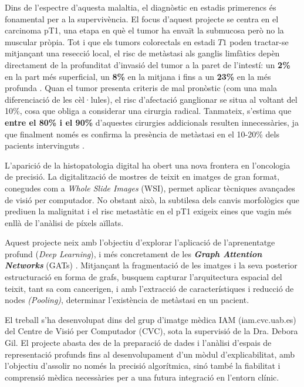 ﻿\documentclass[10pt,a4paper,twocolumn,twoside]{article}
\begin{document}
Dins de l'espectre d'aquesta malaltia, el diagnòstic en estadis primerencs és fonamental per a la supervivència. El focus d'aquest projecte se centra en el carcinoma pT1, una etapa en què el tumor ha envaït la submucosa però no la muscular pròpia. Tot i que els tumors colorectals en estadi $T1$ poden tractar-se mitjançant una resecció local, el risc de metàstasi als ganglis limfàtics depèn directament de la profunditat d'invasió del tumor a la paret de l'intestí: un \textbf{2\%} en la part més superficial, un \textbf{8\%} en la mitjana i fins a un \textbf{23\%} en la més profunda \cite{ParcSalutMar2013}. Quan el tumor presenta criteris de mal pronòstic (com una mala diferenciació de les cèl·lules), el risc d'afectació ganglionar se situa al voltant del 10\%, cosa que obliga a considerar una cirurgia radical. Tanmateix, s'estima que \textbf{entre el 80\% i el 90\%} d'aquestes cirurgies addicionals resulten innecessàries, ja que finalment només es confirma la presència de metàstasi en el 10-20\% dels pacients intervinguts \cite{MartinezDeJuan2024}.

L'aparició de la histopatologia digital ha obert una nova frontera en l'oncologia de precisió. La digitalització de mostres de teixit en imatges de gran format, conegudes com a \textit{Whole Slide Images} (WSI), permet aplicar tècniques avançades de visió per computador. No obstant això, la subtilesa dels canvis morfològics que prediuen la malignitat i el risc metastàtic en el pT1 exigeix eines que vagin més enllà de l'anàlisi de píxels aïllats.

Aquest projecte neix amb l'objectiu d'explorar l'aplicació de l'aprenentatge profund (\textit{Deep Learning}), i més concretament de les \textit{\textbf{Graph Attention Networks}} (GATs) \cite{veličković2018graphattentionnetworks}. Mitjançant la fragmentació de les imatges i la seva posterior estructuració en forma de grafs, busquem capturar l'arquitectura espacial del teixit, tant sa com cancerigen, i amb l'extracció de característiques i reducció de nodes \textit{(Pooling)}, determinar l'existència de metàstasi en un pacient.

El treball s'ha desenvolupat dins del grup d'imatge mèdica IAM (iam.cvc.uab.es) del Centre de Visió per Computador (CVC), sota la supervisió de la Dra. Debora Gil. El projecte abasta des de la preparació de dades i l'anàlisi d'espais de representació profunds fins al desenvolupament d'un mòdul d'explicabilitat, amb l'objectiu d'assolir no només la precisió algorítmica, sinó també la fiabilitat i comprensió mèdica necessàries per a una futura integració en l'entorn clínic.
\end{document}
